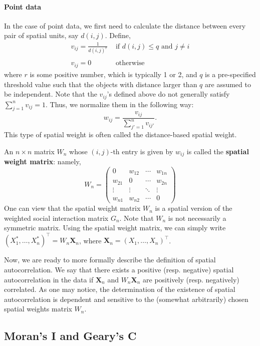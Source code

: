 \documentclass[10.5pt, A4paper, openany, uplatex]{book}
\newcommand{\mbf}{\mathbf}
\numberwithin{equation}{section}
\begin{document}
\paragraph{Point data}
In the case of point data, we first need to calculate the distance between every pair of spatial units, say $d(i,j)$.
Define,
\[
	\begin{array}{ll}
	v_{ij} = \frac{1}{d(i,j)^r}& \text{ if $d(i,j) \leq q $ and $j \neq i$} \\
	& \\
	v_{ij} = 0 &  \text{ otherwise } 
	\end{array}
\]
where $r$ is some positive number, which is typically 1 or 2, and $q$ is a pre-specified threshold value such that the objects with distance larger than $q$ are assumed to be independent.
Note that the $v_{ij}$'s defined above do not generally satisfy $\sum_{j = 1}^n v_{ij} = 1$.
Thus, we normalize them in the following way:
\[
	w_{ij} = \frac{v_{ij}}{\sum_{j' = 1}^n v_{ij'}}.
\]
This type of spatial weight is often called the distance-based spatial weight.
\bigskip

An $n \times n$ matrix $W_n$ whose $(i,j)$-th entry is given by $w_{ij}$ is called the \textbf{spatial weight matrix}: namely,
\[
	W_n = \left(\begin{array}{cccc}
		0            & w_{12} & \cdots & w_{1n} \\
		w_{21} &  0           & \cdots & w_{2n} \\
		\vdots    & \vdots    & \ddots & \vdots \\
		w_{n1} & w_{n2} & \cdots & 0
		\end{array}\right)
\]
One can view that the spatial weight matrix $W_n$ is a spatial version of the weighted social interaction matrix $G_n$.
Note that $W_n$ is not necessarily a symmetric matrix.
Using the spatial weight matrix, we can simply write $(X^*_1, \ldots, X_n^*)^\top = W_n \mbf{X}_n$, where  $\mbf{X}_n = (X_1, \ldots, X_n)^\top$.
\bigskip

Now, we are ready to more formally describe the definition of spatial autocorrelation.
We say that there exists a positive (resp. negative) spatial autocorrelation in the data if $\mbf{X}_n$ and $W_n \mbf{X}_n$ are positively (resp. negatively) correlated.
As one may notice, the determination of the existence of spatial autocorrelation is dependent and sensitive to the (somewhat arbitrarily) chosen spatial weights matrix $W_n$.

\subsection{Moran's I and Geary's C}
\end{document}
